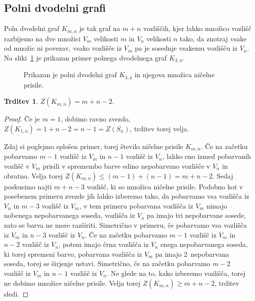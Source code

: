 \documentclass[12pt,a4paper,twoside]{article}
\theoremstyle{definition} %
\theoremstyle{plain} %
\newtheorem{trditev}[definicija]{Trditev}
\numberwithin{equation}{section}  %
\begin{document}
\subsection{Polni dvodelni grafi}
Poln dvodelni graf $K_{m,n}$ je tak graf na $m+n$ vozliščih, kjer lahko množico vozlišč razbijemo na dve množici $V_m$ velikosti $m$ in $V_n$ velikosti $n$ tako, da znotraj vsake od množic ni povezav, vsako vozlišče iz $V_m$ pa je sosednje vsakemu vozlišču iz $V_n$. Na sliki~\ref{fig:polni-dvodelni-graf} je prikazan primer polnega dvodelnega graf $K_{3,4}$.
\begin{figure}[h]
    \centering
    \caption{Prikazan je polni dvodelni graf $K_{3,4}$ in njegova množica ničelne prisile.}
    \label{fig:polni-dvodelni-graf}
\end{figure}
\begin{trditev}
    $Z(K_{m,n}) = m + n - 2$.
\end{trditev}
\begin{proof}
    Če je $m=1$, dobimo ravno zvezdo, $Z(K_{1,n}) = 1 + n - 2 = n - 1 = Z(S_n)$, trditev torej velja.
    
    Zdaj si poglejmo splošen primer, torej število ničelne prisile $K_{m,n}$. Če na začetku pobarvamo $m-1$ vozlišč iz $V_m$ in $n-1$ vozlišč iz $V_n$, lahko eno izmed pobarvanih vozlišč v $V_m$ prisili v spremembo barve edino nepobarvano vozlišče v $V_n$ in obratno. Velja torej $Z(K_{m,n}) \leq (m - 1) + (n - 1) = m + n -2$. Sedaj poskusimo najti $m + n - 3$ vozlišč, ki so množica ničelne prisile. Podobno kot v posebenem primeru zvezde jih lahko izberemo tako, da pobarvamo vsa vozlišča iz $V_n$ in $m-3$ vozlišč iz $V_m$, v tem primeru pobarvana vozlišča iz $V_m$ nimajo nobenega nepobarvanega soseda, vozlišča iz $V_n$ pa imajo tri nepobarvane sosede, zato se barva ne more razširiti. Simetrično v primeru, če pobarvamo vsa vozlišča iz $V_m$ in $n-3$ vozlišč iz $V_n$. Če na začetku pobarvamo $m-1$ vozlišč iz $V_m$ in $n-2$ vozlišč iz $V_n$, potem imajo črna vozlišča iz $V_n$ enega nepobarvanega soseda, ki torej spremeni barvo, pobarvana vozlišča iz $V_m$ pa imajo 2~nepobarvana soseda, torej se širjenje ustavi. Simetrično, če na začetku pobarvamo $m-2$ vozlišč iz $V_m$ in $n-1$ vozlišč iz $V_n$. Ne glede na to, kako izberemo vozlišča, torej ne dobimo množice ničelne prisile. Velja torej $Z(K_{m,n}) \geq m + n - 2$, trditev sledi.
\end{proof}
\end{document}
